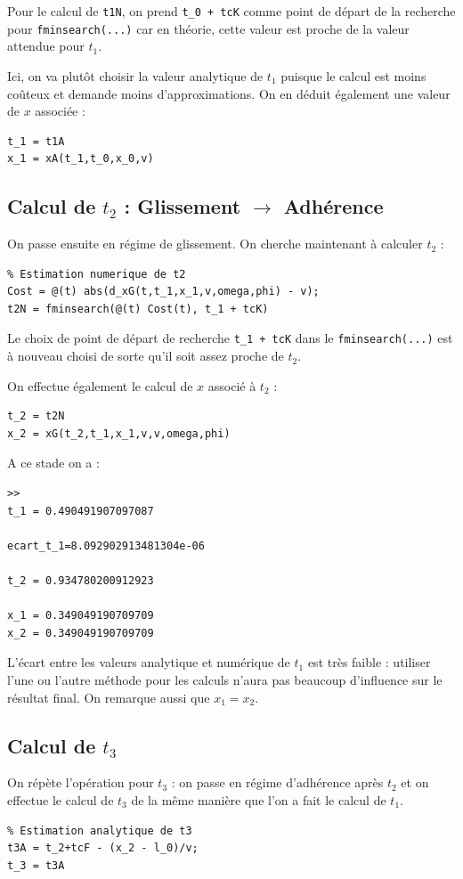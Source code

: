 \documentclass{article}
\begin{document}
Pour le calcul de \verb|t1N|, on prend \verb|t_0 + tcK| comme point de départ de la recherche pour \verb|fminsearch(...)| car en théorie, cette valeur est proche de la valeur attendue pour $t_1$. 

Ici, on va plutôt choisir la valeur analytique de $t_1$ puisque le calcul est moins coûteux et demande moins d'approximations. On en déduit également une valeur de $x$ associée :
\begin{lstlisting}
t_1 = t1A
x_1 = xA(t_1,t_0,x_0,v)
\end{lstlisting}

\subsection{Calcul de $t_2$ : Glissement $\rightarrow$ Adhérence}
On passe ensuite en régime de glissement. On cherche maintenant à calculer $t_2$ : 

\begin{lstlisting}
% Estimation numerique de t2
Cost = @(t) abs(d_xG(t,t_1,x_1,v,omega,phi) - v);
t2N = fminsearch(@(t) Cost(t), t_1 + tcK)
\end{lstlisting}

Le choix de point de départ de recherche \verb|t_1 + tcK| dans le \verb|fminsearch(...)| est à nouveau choisi de sorte qu'il soit assez proche de $t_2$. 

On effectue également le calcul de $x$ associé à $t_2$ :

\begin{lstlisting}
t_2 = t2N
x_2 = xG(t_2,t_1,x_1,v,v,omega,phi)
\end{lstlisting}

A ce stade on a :

\begin{lstlisting}
>>
t_1 = 0.490491907097087

ecart_t_1=8.092902913481304e-06

t_2 = 0.934780200912923

x_1 = 0.349049190709709
x_2 = 0.349049190709709
\end{lstlisting}

L'écart entre les valeurs analytique et numérique de $t_1$ est très faible : utiliser l'une ou l'autre méthode pour les calculs n'aura pas beaucoup d'influence sur le résultat final. On remarque aussi que $x_1=x_2$.

\subsection{Calcul de $t_3$}
On répète l'opération pour $t_3$ : on passe en régime d'adhérence après $t_2$ et on effectue le calcul de $t_3$  de la même manière que l'on a fait le calcul de $t_1$. 
\begin{lstlisting}
% Estimation analytique de t3
t3A = t_2+tcF - (x_2 - l_0)/v;
t_3 = t3A
\end{lstlisting}
 
\end{document}
